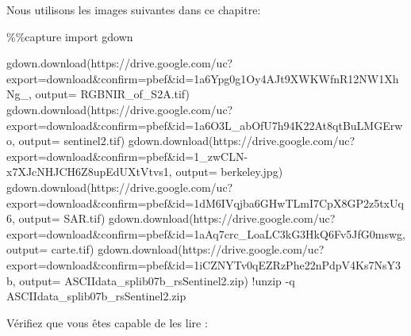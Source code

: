 \documentclass[
  french,
  11pt,
  letterpaper,
  open=any,
  twoside=false,
  french]{scrbook}
\newenvironment{Shaded}{\begin{snugshade}}{\end{snugshade}}
\newcommand{\BuiltInTok}[1]{\textcolor[rgb]{0.00,0.23,0.31}{#1}}
\newcommand{\ImportTok}[1]{\textcolor[rgb]{0.00,0.46,0.62}{#1}}
\newcommand{\NormalTok}[1]{\textcolor[rgb]{0.00,0.23,0.31}{#1}}
\newcommand{\OperatorTok}[1]{\textcolor[rgb]{0.37,0.37,0.37}{#1}}
\newcommand{\StringTok}[1]{\textcolor[rgb]{0.13,0.47,0.30}{#1}}
\begin{document}
Nous utilisons les images suivantes dans ce chapitre:

\begin{Shaded}
\begin{Highlighting}[]
\OperatorTok{\%\%}\NormalTok{capture}
\ImportTok{import}\NormalTok{ gdown}

\NormalTok{gdown.download(}\StringTok{\textquotesingle{}https://drive.google.com/uc?export=download\&confirm=pbef\&id=1a6Ypg0g1Oy4AJt9XWKWfnR12NW1XhNg\_\textquotesingle{}}\NormalTok{, output}\OperatorTok{=} \StringTok{\textquotesingle{}RGBNIR\_of\_S2A.tif\textquotesingle{}}\NormalTok{)}
\NormalTok{gdown.download(}\StringTok{\textquotesingle{}https://drive.google.com/uc?export=download\&confirm=pbef\&id=1a6O3L\_abOfU7h94K22At8qtBuLMGErwo\textquotesingle{}}\NormalTok{, output}\OperatorTok{=} \StringTok{\textquotesingle{}sentinel2.tif\textquotesingle{}}\NormalTok{)}
\NormalTok{gdown.download(}\StringTok{\textquotesingle{}https://drive.google.com/uc?export=download\&confirm=pbef\&id=1\_zwCLN{-}x7XJcNHJCH6Z8upEdUXtVtvs1\textquotesingle{}}\NormalTok{, output}\OperatorTok{=} \StringTok{\textquotesingle{}berkeley.jpg\textquotesingle{}}\NormalTok{)}
\NormalTok{gdown.download(}\StringTok{\textquotesingle{}https://drive.google.com/uc?export=download\&confirm=pbef\&id=1dM6IVqjba6GHwTLmI7CpX8GP2z5txUq6\textquotesingle{}}\NormalTok{, output}\OperatorTok{=} \StringTok{\textquotesingle{}SAR.tif\textquotesingle{}}\NormalTok{)}
\NormalTok{gdown.download(}\StringTok{\textquotesingle{}https://drive.google.com/uc?export=download\&confirm=pbef\&id=1aAq7crc\_LoaLC3kG3HkQ6Fv5JfG0mswg\textquotesingle{}}\NormalTok{, output}\OperatorTok{=} \StringTok{\textquotesingle{}carte.tif\textquotesingle{}}\NormalTok{)}
\NormalTok{gdown.download(}\StringTok{\textquotesingle{}https://drive.google.com/uc?export=download\&confirm=pbef\&id=1iCZNYTv0qEZRzPhe22nPdpV4Ks7NsY3b\textquotesingle{}}\NormalTok{, output}\OperatorTok{=} \StringTok{\textquotesingle{}ASCIIdata\_splib07b\_rsSentinel2.zip\textquotesingle{}}\NormalTok{)}
\OperatorTok{!}\NormalTok{unzip }\OperatorTok{{-}}\NormalTok{q ASCIIdata\_splib07b\_rsSentinel2.}\BuiltInTok{zip}
\end{Highlighting}
\end{Shaded}

Vérifiez que vous êtes capable de les lire :
\end{document}
